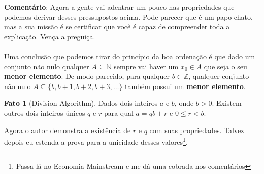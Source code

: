 \documentclass[a4paper,11pt]{book}
\theoremstyle{definition}
\theoremstyle{break}
\newtheorem{fact}{Fato}[section]
\begin{document}
\textbf{Comentário}: Agora a gente vai adentrar um pouco nas propriedades que podemos derivar desses pressupostos acima. Pode parecer que é um papo chato, mas a sua missão é se certificar que você é capaz de compreender toda a explicação. Vença a preguiça.
\\
\\
Uma conclusão que podemos tirar do princípio da boa ordenação é que dado um conjunto não nulo qualquer $A \subseteq \mathbb{N}$ sempre vai haver um $x_0 \in A$ que seja o seu \textbf{menor elemento}. De modo parecido, para qualquer $b \in \mathbb{Z}$, qualquer conjunto não nulo $A \subseteq \{ b, b+1, b+2, b+3, \dots \}$ também possui um \textbf{menor elemento}.

\begin{fact}[Division Algorithm]
Dados dois inteiros $a$ e $b$, onde $b > 0$. Existem outros dois inteiros únicos $q$ e $r$ para qual $a = qb + r$ e $0 \leq r < b$.
\end{fact}

Agora o autor demonstra a existência de $r$ e $q$ com suas propriedades. Talvez depois eu estenda a prova para a unicidade desses valores\footnote{Passa lá no Economia Mainstream e me dá uma cobrada nos comentários}.
\end{document}
